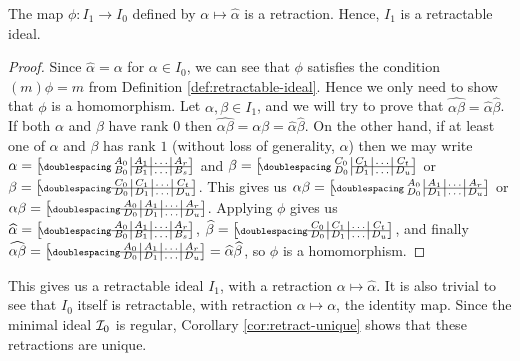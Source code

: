 \begin{proposition}
  \label{prop:hat-retraction}
  The map $\phi: I_1 \to I_0$ defined by $\alpha \mapsto \widehat\alpha$ is a
  retraction.  Hence, $I_1$ is a retractable ideal.
  \begin{proof}
    Since $\widehat\alpha = \alpha$ for $\alpha \in I_0$, we can see that $\phi$
    satisfies the condition $(m)\phi = m$ from Definition
    \ref{def:retractable-ideal}.  Hence we only need to show that $\phi$ is a
    homomorphism. Let
    $\alpha,\beta \in I_1$, and we will try to prove that
    $\widehat{\alpha\beta} = \widehat\alpha \widehat\beta$.  If both $\alpha$
    and $\beta$ have rank $0$ then
    $\widehat{\alpha\beta} = \alpha\beta = \widehat\alpha \widehat\beta$.  On
    the other hand, if at least one of $\alpha$ and $\beta$ has rank $1$ (without
    loss of generality, $\alpha$) then we may write
    $\alpha = \bipart{c|c|c|c}{2-4}{A_0&A_1&\ldots&A_r}{B_0&B_1&\ldots&B_s}$ and
    $\beta = \bipart{c|c|c|c}{2-4}{C_0&C_1&\ldots&C_t}{D_0&D_1&\ldots&D_u}$ or
    $\beta = \bipart{c|c|c|c}{1-4}{C_0&C_1&\ldots&C_t}{D_0&D_1&\ldots&D_u}$.
    This gives us
    $\alpha\beta =
    \bipart{c|c|c|c}{2-4}{A_0&A_1&\ldots&A_r}{D_0&D_1&\ldots&D_u}$ or
    $\alpha\beta =
    \bipart{c|c|c|c}{1-4}{A_0&A_1&\ldots&A_r}{D_0&D_1&\ldots&D_u}$.  Applying
    $\phi$ gives us
    $\widehat\alpha =
    \bipart{c|c|c|c}{1-4}{A_0&A_1&\ldots&A_r}{B_0&B_1&\ldots&B_s}$,
    $\widehat\beta =
    \bipart{c|c|c|c}{1-4}{C_0&C_1&\ldots&C_t}{D_0&D_1&\ldots&D_u}$, and finally
    $\widehat{\alpha\beta} =
    \bipart{c|c|c|c}{1-4}{A_0&A_1&\ldots&A_r}{D_0&D_1&\ldots&D_u} =
    \widehat\alpha \widehat\beta$, so $\phi$ is a homomorphism.
  \end{proof}
\end{proposition}

This gives us a retractable ideal $I_1$, with a retraction
$\alpha \mapsto \widehat\alpha$.  It is also trivial to see that $I_0$ itself is
retractable, with retraction $\alpha \mapsto \alpha$, the identity map.  Since
the minimal ideal $\mathcal{I}_0$ is regular, Corollary \ref{cor:retract-unique} shows
that these retractions are unique.

